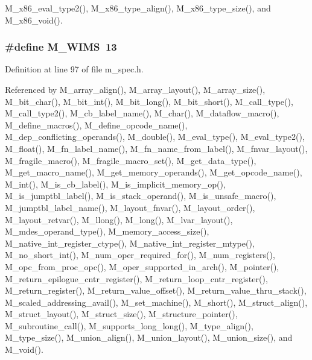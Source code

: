 M\_\-x86\_\-eval\_\-type2(), M\_\-x86\_\-type\_\-align(), M\_\-x86\_\-type\_\-size(), and M\_\-x86\_\-void().
\subsubsection{\setlength{\rightskip}{0pt plus 5cm}\#define M\_\-WIMS~13}\label{m__spec_8h_7370e17cada5749b33d6ef39d9c849fe}




Definition at line 97 of file m\_\-spec.h.

Referenced by M\_\-array\_\-align(), M\_\-array\_\-layout(), M\_\-array\_\-size(), M\_\-bit\_\-char(), M\_\-bit\_\-int(), M\_\-bit\_\-long(), M\_\-bit\_\-short(), M\_\-call\_\-type(), M\_\-call\_\-type2(), M\_\-cb\_\-label\_\-name(), M\_\-char(), M\_\-dataflow\_\-macro(), M\_\-define\_\-macros(), M\_\-define\_\-opcode\_\-name(), M\_\-dep\_\-conflicting\_\-operands(), M\_\-double(), M\_\-eval\_\-type(), M\_\-eval\_\-type2(), M\_\-float(), M\_\-fn\_\-label\_\-name(), M\_\-fn\_\-name\_\-from\_\-label(), M\_\-fnvar\_\-layout(), M\_\-fragile\_\-macro(), M\_\-fragile\_\-macro\_\-set(), M\_\-get\_\-data\_\-type(), M\_\-get\_\-macro\_\-name(), M\_\-get\_\-memory\_\-operands(), M\_\-get\_\-opcode\_\-name(), M\_\-int(), M\_\-is\_\-cb\_\-label(), M\_\-is\_\-implicit\_\-memory\_\-op(), M\_\-is\_\-jumptbl\_\-label(), M\_\-is\_\-stack\_\-operand(), M\_\-is\_\-unsafe\_\-macro(), M\_\-jumptbl\_\-label\_\-name(), M\_\-layout\_\-fnvar(), M\_\-layout\_\-order(), M\_\-layout\_\-retvar(), M\_\-llong(), M\_\-long(), M\_\-lvar\_\-layout(), M\_\-mdes\_\-operand\_\-type(), M\_\-memory\_\-access\_\-size(), M\_\-native\_\-int\_\-register\_\-ctype(), M\_\-native\_\-int\_\-register\_\-mtype(), M\_\-no\_\-short\_\-int(), M\_\-num\_\-oper\_\-required\_\-for(), M\_\-num\_\-registers(), M\_\-opc\_\-from\_\-proc\_\-opc(), M\_\-oper\_\-supported\_\-in\_\-arch(), M\_\-pointer(), M\_\-return\_\-epilogue\_\-cntr\_\-register(), M\_\-return\_\-loop\_\-cntr\_\-register(), M\_\-return\_\-register(), M\_\-return\_\-value\_\-offset(), M\_\-return\_\-value\_\-thru\_\-stack(), M\_\-scaled\_\-addressing\_\-avail(), M\_\-set\_\-machine(), M\_\-short(), M\_\-struct\_\-align(), M\_\-struct\_\-layout(), M\_\-struct\_\-size(), M\_\-structure\_\-pointer(), M\_\-subroutine\_\-call(), M\_\-supports\_\-long\_\-long(), M\_\-type\_\-align(), M\_\-type\_\-size(), M\_\-union\_\-align(), M\_\-union\_\-layout(), M\_\-union\_\-size(), and M\_\-void().
